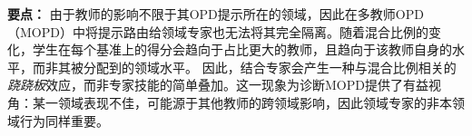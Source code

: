 \begin{insightbox}
\textbf{要点：}
由于教师的影响不限于其OPD提示所在的领域，因此在多教师OPD（MOPD）中将提示路由给领域专家也无法将其完全隔离。随着混合比例的变化，学生在每个基准上的得分会趋向于占比更大的教师，且趋向于该教师自身的水平，而非其被分配到的领域水平。  
因此，结合专家会产生一种与混合比例相关的\emph{跷跷板}效应，而非专家技能的简单叠加。这一现象为诊断MOPD提供了有益视角：某一领域表现不佳，可能源于其他教师的跨领域影响，因此领域专家的非本领域行为同样重要。
\end{insightbox}
